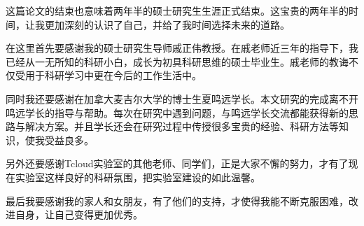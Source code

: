 \begin{thanks}

  这篇论文的结束也意味着两年半的硕士研究生生涯正式结束。这宝贵的两年半的时间，让我更加深刻的认识了自己，并给了我时间选择未来的道路。

  在这里首先要感谢我的硕士研究生导师戚正伟教授。在戚老师近三年的指导下，我已经从一无所知的科研小白，成长为初具科研思维的硕士毕业生。戚老师的教诲不仅受用于科研学习中更在今后的工作生活中。

  同时我还要感谢在加拿大麦吉尔大学的博士生夏鸣远学长。本文研究的完成离不开鸣远学长的指导与帮助。每次在研究中遇到问题，与鸣远学长交流都能获得新的思路与解决方案。并且学长还会在研究过程中传授很多宝贵的经验、科研方法等知识，使我受益良多。

  另外还要感谢Tcloud实验室的其他老师、同学们，正是大家不懈的努力，才有了现在实验室这样良好的科研氛围，把实验室建设的如此温馨。

  最后我要感谢我的家人和女朋友，有了他们的支持，才使得我能不断克服困难，改进自身，让自己变得更加优秀。

\end{thanks}
